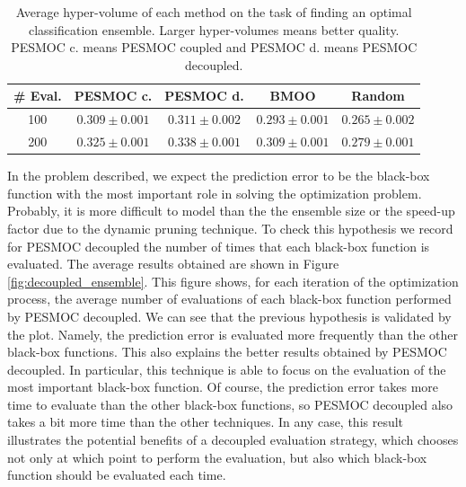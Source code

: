 \documentclass[review,preprint,12pt]{elsarticle}
\begin{document}
\begin{table}[htb]
\small
\centering
\caption{Average hyper-volume of each method on the task of finding an optimal classification 
	ensemble. Larger hyper-volumes means better quality. PESMOC c. means PESMOC coupled and PESMOC d. means 
PESMOC decoupled.}
\begin{tabular}{ c c c c c}
 \hline
\textbf{\# Eval.} & \textbf{PESMOC c.} & \textbf{PESMOC d.} & \textbf{BMOO} & \textbf{Random} \\
\hline
100 & $ 0.309  \pm  0.001 $ & $\mathbf{ 0.311 \pm  0.002 }$ & $ 0.293 \pm  0.001$ & $ 0.265 \pm  0.002 $ \\
\hline
200 & $ 0.325 \pm  0.001 $ & $\mathbf{ 0.338 \pm  0.001 }$ & $ 0.309 \pm  0.001 $ & $ 0.279 \pm  0.001$ \\
\hline
\end{tabular}
\label{table:hyper_ensemble}
\end{table}

In the problem described, we expect the prediction error to be the black-box function with the most important 
role in solving the optimization problem. Probably, it is more difficult to model than the the ensemble 
size or the speed-up factor due to the dynamic pruning technique. To check this hypothesis we record for 
PESMOC decoupled the number of times that each black-box function is evaluated. The average results obtained are 
shown in Figure \ref{fig:decoupled_ensemble}. 
This figure shows, for each iteration of the optimization process, the average number of evaluations of each
black-box function performed by PESMOC decoupled. 
We can see that the previous hypothesis is validated by the plot. 
Namely, the prediction error is evaluated more frequently than the other black-box functions. This also explains 
the better results obtained by PESMOC decoupled. In particular, this technique is able to focus on the evaluation of
the most important black-box function. Of course, the prediction error takes more time to evaluate than the 
other black-box functions, so PESMOC decoupled also takes a bit more time than the other techniques. In any case, 
this result illustrates the potential benefits of a decoupled evaluation strategy, which chooses not only at which
point to perform the evaluation, but also which black-box function should be evaluated each time.
\end{document}
